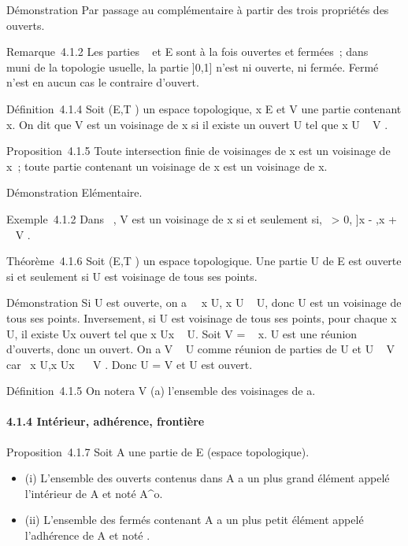 Démonstration Par passage au complémentaire à partir des trois
propriétés des ouverts.

Remarque~4.1.2 Les parties \varnothing~ et E sont à la fois ouvertes et fermées~;
dans ~ muni de la topologie usuelle, la partie {]}0,1{]} n'est ni
ouverte, ni fermée. Fermé n'est en aucun cas le contraire d'ouvert.

Définition~4.1.4 Soit (E,T ) un espace topologique, x \in E et V une
partie contenant x. On dit que V est un voisinage de x si il existe un
ouvert U tel que x \in U \subset~ V .

Proposition~4.1.5 Toute intersection finie de voisinages de x est un
voisinage de x~; toute partie contenant un voisinage de x est un
voisinage de x.

Démonstration Elémentaire.

Exemple~4.1.2 Dans ~, V est un voisinage de x si et seulement si,
\exists~\epsilon \textgreater{} 0, {]}x - \epsilon,x + \epsilon{[}\subset~ V .

Théorème~4.1.6 Soit (E,T ) un espace topologique. Une partie U de E est
ouverte si et seulement si U est voisinage de tous ses points.

Démonstration Si U est ouverte, on a \forall~~x \in U, x
\in U \subset~ U, donc U est un voisinage de tous ses points. Inversement, si U
est voisinage de tous ses points, pour chaque x \in U, il existe
Ux ouvert tel que x \in Ux \subset~ U. Soit V
= \⋃ ~
x\inUUx. U est une réunion d'ouverts, donc un ouvert. On
a V \subset~ U comme réunion de parties de U et U \subset~ V car
\forall~x \in U,x \in Ux~ \subset~ V . Donc U = V et U
est ouvert.

Définition~4.1.5 On notera V (a) l'ensemble des voisinages de a.

\paragraph{4.1.4 Intérieur, adhérence, frontière}

Proposition~4.1.7 Soit A une partie de E (espace topologique).

\begin{itemize}
\itemsep1pt\parskip0pt
\item
  (i) L'ensemble des ouverts contenus dans A a un plus grand élément
  appelé l'intérieur de A et noté A^o.
\item
  (ii) L'ensemble des fermés contenant A a un plus petit élément appelé
  l'adhérence de A et noté \overlineA.
\end{itemize}

